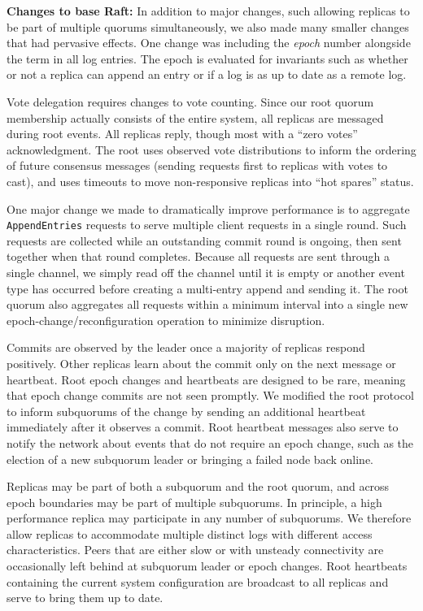 \textbf{Changes to base Raft:} In addition to major changes, such allowing replicas to be part of multiple quorums simultaneously, we also made many smaller changes that had pervasive effects.
One change was including the \textit{epoch} number alongside the term in all log entries.
The epoch is evaluated for invariants such as whether or not a replica can append an entry or if a log is as up to date as a remote log.

Vote delegation requires changes to vote counting.
Since our root quorum membership actually consists of the entire system, all replicas are messaged during root events.
All replicas reply, though most with a ``zero votes'' acknowledgment.
The root uses observed vote distributions to inform the ordering of future consensus messages (sending requests first to replicas with votes to cast), and uses timeouts to move non-responsive replicas into ``hot spares'' status.

One major change we made to dramatically improve performance is to aggregate \texttt{AppendEntries} requests to serve multiple client requests in a single round.
Such requests are collected while an outstanding commit round is ongoing, then sent together when that round completes.
Because all requests are sent through a single channel, we simply read off the channel until it is empty or another event type has occurred before creating a multi-entry append and sending it.
The root quorum also aggregates all requests within a minimum interval into a single new epoch-change/reconfiguration operation to minimize disruption.

Commits are observed by the leader once a majority of replicas respond positively.
Other replicas learn about the commit only on the next message or heartbeat.
Root epoch changes and heartbeats are designed to be rare, meaning that epoch change commits are not seen promptly.
We modified the root protocol to inform subquorums of the change by sending an additional heartbeat immediately after it observes a commit.
Root heartbeat messages also serve to notify the network about events that do not require an epoch change, such as the election of a new subquorum leader or bringing a failed node back online.

Replicas may be part of both a subquorum and the root quorum, and across epoch boundaries may be part of multiple subquorums.
In principle, a high performance replica may participate in any number of subquorums.
We therefore allow replicas to accommodate multiple distinct logs with different access characteristics.
Peers that are either slow or with unsteady connectivity are occasionally left behind at subquorum leader or epoch changes.
Root heartbeats containing the current system configuration are broadcast to all replicas and serve to bring them up to date.

